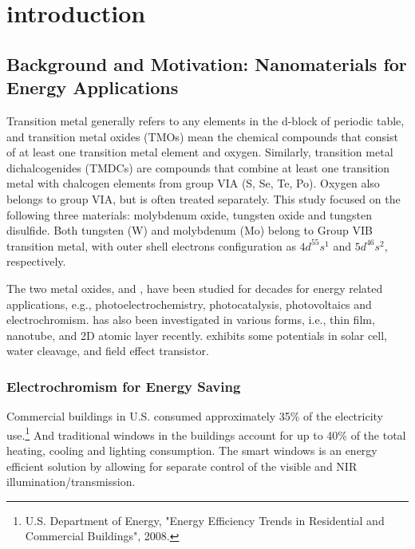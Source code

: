 
\chapter{introduction}

\section{Background and Motivation: Nanomaterials for Energy Applications}

Transition metal generally refers to any elements in the d-block of periodic table, and transition metal oxides (TMOs) mean the chemical compounds that consist of at least one transition metal element and oxygen. Similarly, transition metal dichalcogenides (TMDCs) are compounds that combine at least one transition metal with chalcogen elements from group VIA (S, Se, Te, Po). Oxygen also belongs to group VIA, but is often treated separately. This study focused on the following three materials: molybdenum oxide, tungsten oxide and tungsten disulfide. Both tungsten (W) and molybdenum (Mo) belong to Group VIB transition metal, with outer shell electrons configuration as $4d^55s^1$ and $5d^46s^2$, respectively. 
 
The two metal oxides,  and , have been studied for decades for energy related applications, e.g., photoelectrochemistry,\cite{Su2010} photocatalysis,\cite{Watcharenwong2008, Macphee2010} photovoltaics\cite{Coridan2013} and electrochromism.\cite{Yoshimura1985, Mortimer2011}  has also been investigated in various forms, i.e., thin film, nanotube, and 2D atomic layer recently.  exhibits some potentials in solar cell, water cleavage, and field effect transistor. 



\subsection{Electrochromism for Energy Saving}

Commercial buildings in U.S. consumed approximately 35\% of the electricity use.\footnote{U.S. Department of Energy, "Energy Efficiency Trends in Residential and Commercial Buildings", 2008.} And traditional windows in the buildings account for up to 40\% of the total heating, cooling and lighting consumption. The smart windows is an energy efficient solution by allowing for separate control of the visible and NIR illumination/transmission.

